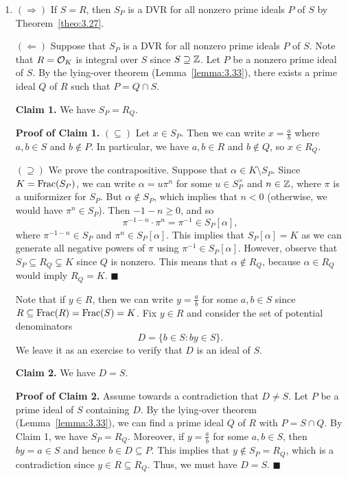 \begin{pf}
    \begin{enumerate}[(1)]
        \item $(\Rightarrow)$ If $S = R$, then $S_P$ is a DVR for all nonzero prime ideals 
        $P$ of $S$ by Theorem~\ref{theo:3.27}.

        $(\Leftarrow)$ Suppose that $S_P$ is a DVR for all nonzero prime ideals $P$ of $S$. 
        Note that $R = {\cal O}_K$ is integral over $S$ since $S \supseteq \mathbb{Z}$. Let 
        $P$ be a nonzero prime ideal of $S$. By the lying-over theorem (Lemma~\ref{lemma:3.33}), 
        there exists a prime ideal $Q$ of $R$ such that $P = Q \cap S$. 

        {\bf Claim 1.} We have $S_P = R_Q$. 

        {\bf Proof of Claim 1.} $(\subseteq)$ Let $x \in S_P$. Then we can write 
        $x = \frac{a}{b}$ where $a, b \in S$ and $b \notin P$. In particular, we have 
        $a, b \in R$ and $b \notin Q$, so $x \in R_Q$. 

        $(\supseteq)$ We prove the contrapositive. Suppose that $\alpha \in K \setminus S_P$. 
        Since $K = \operatorname{Frac}(S_P)$, we can write $\alpha = u\pi^n$ for some $u \in S_P^\times$ 
        and $n \in \mathbb{Z}$, where $\pi$ is a uniformizer for $S_P$. But $\alpha \notin S_P$, 
        which implies that $n < 0$ (otherwise, we would have $\pi^n \in S_P$). 
        Then $-1 - n \geq 0$, and so 
        \[ \pi^{-1-n} \cdot \pi^n = \pi^{-1} \in S_P[\alpha], \] 
        where $\pi^{-1-n} \in S_P$ and $\pi^n \in S_P[\alpha]$. This implies that $S_P[\alpha] = K$
        as we can generate all negative powers of $\pi$ using $\pi^{-1} \in S_P[\alpha]$. 
        However, observe that $S_P \subseteq R_Q \subsetneq K$ since $Q$ is nonzero. This 
        means that $\alpha \notin R_Q$, because $\alpha \in R_Q$ would imply $R_Q = K$.
        \hfill $\blacksquare$

        Note that if $y \in R$, then we can write $y = \frac{a}{b}$ for some $a, b \in S$
        since $R \subseteq \operatorname{Frac}(R) = \operatorname{Frac}(S) = K$. Fix $y \in R$ and consider 
        the set of potential denominators
        \[ D = \{b \in S : by \in S\}. \] 
        We leave it as an exercise to verify that $D$ is an ideal of $S$. 

        {\bf Claim 2.} We have $D = S$. 

        {\bf Proof of Claim 2.} Assume towards a contradiction that $D \neq S$. Let 
        $P$ be a prime ideal of $S$ containing $D$. By the lying-over theorem 
        (Lemma~\ref{lemma:3.33}), we can find a prime ideal $Q$ of $R$ with $P = S \cap Q$. 
        By Claim 1, we have $S_P = R_Q$. Moreover, if $y = \frac{a}{b}$ for some $a, b \in S$, 
        then $by = a \in S$ and hence $b \in D \subseteq P$. This implies that 
        $y \notin S_P = R_Q$, which is a contradiction since $y \in R \subseteq R_Q$. 
        Thus, we must have $D = S$. 
        \hfill $\blacksquare$


\end{enumerate}
\end{pf}
